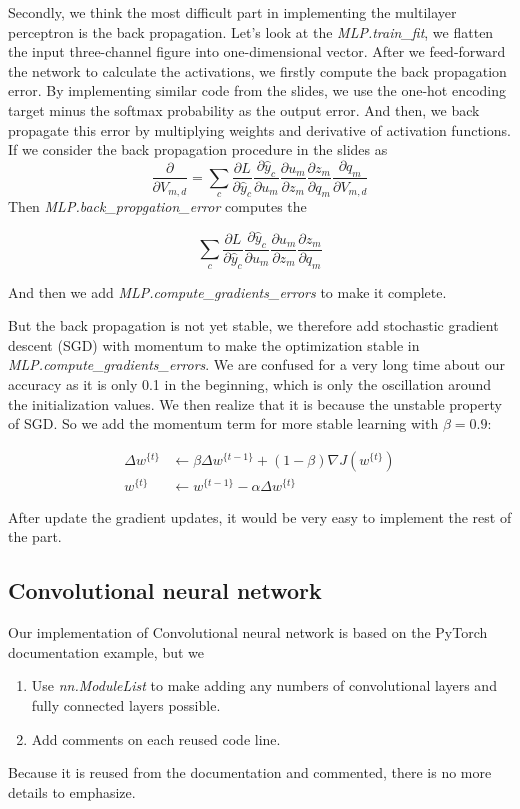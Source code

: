 \documentclass[11pt]{scrartcl}
\begin{document}
Secondly, we think the most difficult part in implementing the multilayer perceptron is the back propagation. Let's look at the \textit{MLP.train\_fit}, we flatten the input three-channel figure into one-dimensional vector. After we feed-forward the network to calculate the activations, we firstly compute the back propagation error. By implementing similar code from the slides, we use the one-hot encoding target minus the softmax probability as the output error. And then, we back propagate this error by multiplying weights and derivative of activation functions. If we consider the back propagation procedure in the slides as
\begin{equation*}
	\frac{\partial}{\partial V_{m,d}} = \sum_{c} \frac{\partial L}{\partial \hat{y}_c} \frac{\partial \hat{y}_c}{\partial u_m} \frac{\partial u_m}{\partial z_m} \frac{\partial z_m}{\partial q_m} \frac{\partial q_m}{\partial V_{m,d}}
\end{equation*}
Then \textit{MLP.back\_propgation\_error} computes the 

$$\sum_{c} \frac{\partial L}{\partial \hat{y}_c} \frac{\partial \hat{y}_c}{\partial u_m} \frac{\partial u_m}{\partial z_m} \frac{\partial z_m}{\partial q_m}$$

And then we add \textit{MLP.compute\_gradients\_errors} to make it complete. 

But the back propagation is not yet stable, we therefore add stochastic gradient descent (SGD) with momentum to make the optimization stable in \textit{MLP.compute\_gradients\_errors}. We are confused for a very long time about our accuracy as it is only 0.1 in the beginning, which is only the oscillation around the initialization values. We then realize that it is because the unstable property of SGD. So we add the momentum term for more stable learning with $\beta = 0.9$:

\begin{align*}
	\Delta w^{\{t\}} & \gets \beta \Delta w^{\{t-1\}} + (1-\beta) \nabla J (w^{\{t\}})\\
	w^{\{t\}} & \gets w^{\{t-1\}} - \alpha \Delta w^{\{t\}}
\end{align*}

After update the gradient updates, it would be very easy to implement the rest of the part.

\subsection{Convolutional neural network}
Our implementation of Convolutional neural network is based on the PyTorch documentation example, but we
\begin{enumerate}[(1)]
	\item Use \textit{nn.ModuleList} to make adding any numbers of convolutional layers and fully connected layers possible.
	\item Add comments on each reused code line. 
\end{enumerate}
Because it is reused from the documentation and commented, there is no more details to emphasize.
\end{document}
